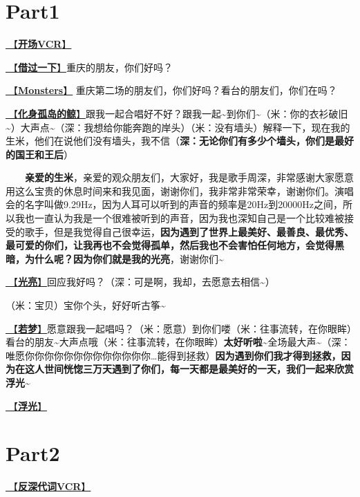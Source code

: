 \documentclass[]{ctexbook}
\begin{document}
\newpage

\section{Part1}\label{chongqing-20241007-part1}

\hyperref[opening-vcr]{🎥【\textbf{开场VCR}】}

\hyperref[I-will-go-my-way]{🎵【\textbf{借过一下}】}重庆的朋友，你们好吗？

\hyperref[Monsters]{🎵【\textbf{Monsters}】}
重庆第二场的朋友们，你们好吗？看台的朋友们，你们在吗？

\hyperref[hua-shen-gu-dao-de-jing]{🎵【\textbf{化身孤岛的鲸}】}跟我一起合唱好不好？跟我一起\textasciitilde 到你们\textasciitilde（米：你的衣衫破旧\textasciitilde）大声点\textasciitilde（深：我想给你能奔跑的岸头）（米：没有墙头）解释一下，现在我的生米，他们在说他们没有墙头，我不信（\textbf{深：无论你们有多少个墙头，你们是最好的国王和王后}）

  \textbf{亲爱的生米}，亲爱的观众朋友们，大家好，我是歌手周深，非常感谢大家愿意用这么宝贵的休息时间来和我见面，谢谢你们，我非常非常荣幸，谢谢你们。演唱会的名字叫做9.29Hz，因为人耳可以听到的声音的频率是20Hz到20000Hz之间，所以我也一直认为我是一个很难被听到的声音，因为我也深知自己是一个比较难被接受的歌手，但是我觉得自己很幸运，\textbf{因为遇到了世界上最美好、最善良、最优秀、最可爱的你们，让我再也不会觉得孤单，然后我也不会害怕任何地方，会觉得黑暗，为什么呢？因为你们就是我的光亮}，谢谢你们\textasciitilde{}

\hyperref[silver-linings]{🎵【\textbf{光亮}】}回应我好吗？（深：可是啊，我却，去愿意去相信\textasciitilde）

（米：宝贝）宝你个头，好好听古筝\textasciitilde{}

\hyperref[ruomeng]{🎵【\textbf{若梦}】}愿意跟我一起唱吗？（米：愿意）到你们喽（米：往事流转，在你眼眸）看台的朋友\textasciitilde 大声点哦（米：往事流转，在你眼眸）\textbf{太好听啦\textasciitilde{}}全场最大声\textasciitilde（深：唯愿你你你你你你你你你你你你你\ldots 能得到拯救）\textbf{因为遇到你们我才得到拯救，因为在这人世间恍惚三万天遇到了你们，每一天都是最美好的一天，我们一起来欣赏浮光\textasciitilde{}}

\hyperref[floating-light]{🎵【\textbf{浮光}】}

\section{Part2}\label{chongqing-20241007-part2}

\hyperref[senself-vcr]{🎥【\textbf{反深代词VCR}】}
\end{document}

